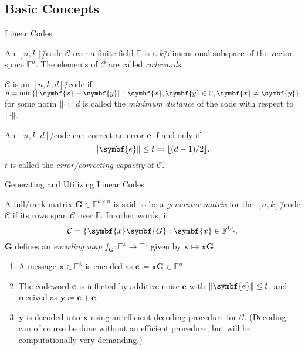 \documentclass[usepdftitle=false]{beamer}
\renewcommand*{\vec}{\symbf}
\newcommand*{\mat}{\symbf}
\newcommand*{\FF}{\ensuremath{\mathbb{F}}}
\DeclarePairedDelimiter{\floor}{\lfloor}{\rfloor}
\DeclarePairedDelimiter{\norm}{\lVert}{\rVert}
\begin{document}
\subsection{Basic Concepts}

\begin{frame}{Linear Codes}
  \begin{definition}
    An \([n, k]\)\=/code \(\mathcal{C}\) over a finite field \(\FF\)
    is a \(k\)\=/dimensional subspace of the vector space \(\FF^n\).
    The elements of \(\mathcal{C}\) are called \emph{codewords}.

    \(\mathcal{C}\) is an \([n, k, d]\)\=/code if
    \(d = \min\{\norm{\vec{x} - \vec{y}} : \vec{x}, \vec{y} \in
    \mathcal{C}, \vec{x} \ne \vec{y}\}\) for some norm
    \(\norm{\cdot}\).  \(d\) is called the \emph{minimum distance} of
    the code with respect to \(\norm{\cdot}\).
  \end{definition}
  An \([n, k, d]\)\=/code can correct an error \(\vec{e}\) if and only
  if \[\norm{\vec{e}} \le t \eqqcolon \floor{(d - 1) / {2}}\text.\]
  \(t\) is called the \emph{error\-/correcting capacity} of
  \(\mathcal{C}\).
\end{frame}

\begin{frame}{Generating and Utilizing Linear Codes}
  \begin{definition}
    A full\-/rank matrix \(\mat{G} \in \FF^{k \times n}\) is said to
    be a \emph{generator matrix} for the \([n, k]\)\=/code
    \(\mathcal{C}\) if its rows span \(\mathcal{C}\) over \(\FF\).  In
    other words, if
    \[
      \mathcal{C} = \{\vec{x} \mat{G} : \vec{x} \in \FF^k\}\text.
    \]
    \(\mat{G}\) defines an \emph{encoding map}
    \(f_{\mat{G}}\colon \FF^k \to \FF^n\) given by
    \(\vec{x} \mapsto \vec{x} \vec{G}\).
  \end{definition}
  \begin{enumerate}
  \item A message \(\vec{x} \in \FF^k\) is encoded as
    \(\vec{c} \coloneqq \vec{x} \mat{G} \in \FF^n\).
  \item The codeword \(\vec{c}\) is inflicted by additive noise
    \(\vec{e}\) with \(\norm{\vec{e}} \le t\), and received as
    \(\vec{y} \coloneqq \vec{c} + \vec{e}\).
  \item \(\vec{y}\) is decoded into \(\vec{x}\) using an efficient
    decoding procedure for \(\mathcal{C}\).  (Decoding can of course
    be done without an efficient procedure, but will be
    computationally very demanding.)
  \end{enumerate}
\end{frame}
\end{document}
